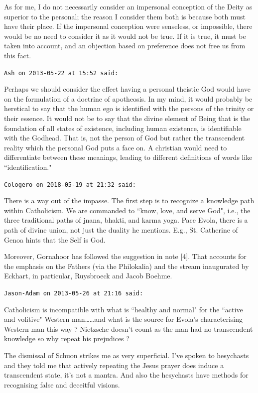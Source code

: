 \begin{footnotesize}
\begin{sffamily}
As for me, I do not necessarily consider an impersonal conception of the Deity as superior to the personal; the reason I consider them both is because both must have their place. If the impersonal conception were senseless, or impossible, there would be no need to consider it as it would not be true. If it is true, it must be taken into account, and an objection based on preference does not free us from this fact.


\hfill

\texttt{Ash on 2013-05-22 at 15:52 said: }

Perhaps we should consider the effect having a personal theistic God would have on the formulation of a doctrine of apotheosis. In my mind, it would probably be heretical to say that the human ego is identified with the persons of the trinity or their essence. It would not be to say that the divine element of Being that is the foundation of all states of existence, including human existence, is identifiable with the Godhead. That is, not the person of God but rather the transcendent reality which the personal God puts a face on. A christian would need to differentiate between these meanings, leading to different definitions of words like ``identification."


\hfill

\texttt{Cologero on 2018-05-19 at 21:32 said: }

There is a way out of the impasse. The first step is to recognize a knowledge path within Catholicism. We are commanded to ``know, love, and serve God", i.e., the three traditional paths of jnana, bhakti, and karma yoga. Pace Evola, there is a path of divine union, not just the duality he mentions. E.g., St. Catherine of Genoa hints that the Self is God.

Moreover, Gornahoor has followed the suggestion in note [4]. That accounts for the emphasis on the Fathers (via the Philokalia) and the stream inaugurated by Eckhart, in particular, Ruysbroeck and Jacob Boehme.


\hfill

\texttt{Jason-Adam on 2013-05-26 at 21:16 said: }

Catholicism is incompatible with what is ``healthy and normal" for the ``active and volitive" Western man……and what is the source for Evola's characterising Western man this way ? Nietzsche doesn't count as the man had no transcendent knowledge so why repeat his prejudices ?

The dismissal of Schuon strikes me as very superficial. I've spoken to hesychasts and they told me that actively repeating the Jesus prayer does induce a transcendent state, it's not a mantra. And also the hesychasts have methods for recognising false and deceitful visions.



\end{sffamily}
\end{footnotesize}
